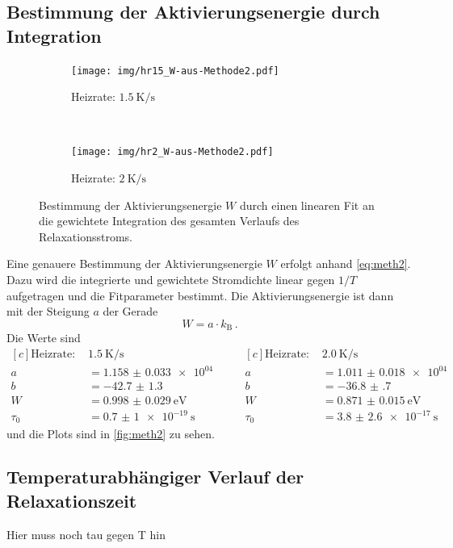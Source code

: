 \subsection{Bestimmung der Aktivierungsenergie durch Integration}

\begin{figure}[htp]
    \centering
    \begin{subfigure}[t]{0.5\textwidth}
        \centering
        \texttt{[image: img/hr15\_W-aus-Methode2.pdf]}
        \caption{Heizrate: $\SI{1.5}{\kelvin\per\second}$}
    \end{subfigure}%
    ~
    \begin{subfigure}[t]{0.5\textwidth}
        \centering
        \texttt{[image: img/hr2\_W-aus-Methode2.pdf]}
        \caption{Heizrate: $\SI{2}{\kelvin\per\second}$}
    \end{subfigure}
    \caption{Bestimmung der Aktivierungsenergie $W$ durch einen linearen Fit an die gewichtete Integration des gesamten Verlaufs des Relaxationsstroms.}
    \label{fig:meth2}
\end{figure}

Eine genauere Bestimmung der Aktivierungsenergie $W$ erfolgt anhand \autoref{eq:meth2}. Dazu wird die integrierte und gewichtete Stromdichte linear gegen $1/T$ aufgetragen und die Fitparameter bestimmt. Die Aktivierungsenergie ist dann mit der Steigung $a$ der Gerade
\begin{equation*}
    W = a \cdot k_\text{B}\,.
\end{equation*}
Die Werte sind
\begin{equation*}
\begin{aligned}[c]
  \text{Heizrate: }& \SI{1.5}{\kelvin\per\second}\\
  a &= \num{1.158(33)e+04}\\
  b &= \num{-42.7(13)}\\
  W &= \SI{0.998(29)}{\electronvolt}\\
  \tau_0 &= \SI{0.7(10)e-19}{\second}
\end{aligned}
\qquad
\begin{aligned}[c]
  \text{Heizrate: }& \SI{2.0}{\kelvin\per\second}\\
  a &= \num{1.011(18)e+04}\\
  b &= \num{-36.8(7)}\\
  W &= \SI{0.871(15)}{\electronvolt}\\
  \tau_0 &= \SI{3.8(26)e-17}{\second}
\end{aligned}
\end{equation*}
und die Plots sind in \autoref{fig:meth2} zu sehen.

\subsection{Temperaturabhängiger Verlauf der Relaxationszeit}

Hier muss noch tau gegen T hin
